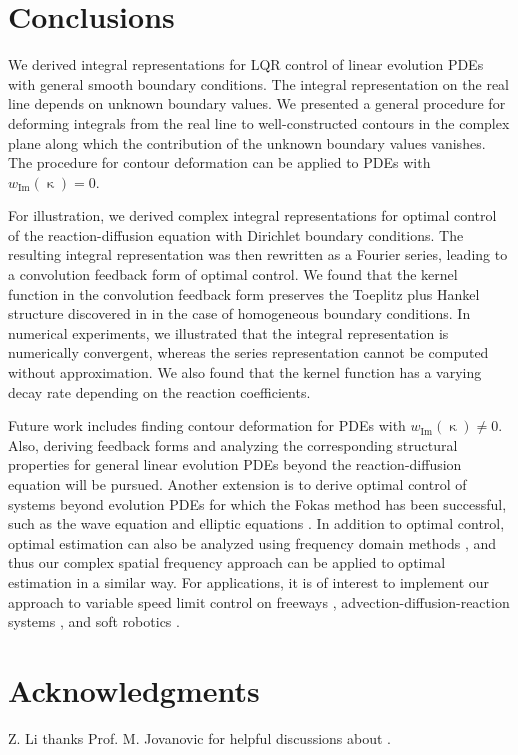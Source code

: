 \documentclass[journal,twoside,web]{ieeecolor}
\newcommand{\kcomplex}{\upkappa}
\begin{document}
\section{Conclusions}\label{sec:conclusion}
We derived integral representations for LQR control of linear evolution PDEs with general smooth boundary conditions. 
The integral representation on the real line depends on unknown boundary values.
We presented a general procedure for deforming integrals from the real line to well-constructed contours in the complex plane along which the contribution of the unknown boundary values vanishes. 
The procedure for contour deformation can be applied to PDEs with $w_{\text{Im}}(\kcomplex)=0$. 

For illustration, we derived complex integral representations for optimal control of the reaction-diffusion equation with Dirichlet boundary conditions.
The resulting integral representation was then rewritten as a Fourier series, leading to a convolution feedback form of optimal control.
We found that the kernel function in the convolution feedback form preserves the Toeplitz plus Hankel structure discovered in \cite{epperlein2016spatially} in the case of homogeneous boundary conditions.
In numerical experiments, we illustrated that the integral representation is numerically convergent, whereas the series representation cannot be computed without approximation.
We also found that the kernel function has a varying decay rate depending on the reaction coefficients.

Future work includes finding contour deformation for PDEs with $w_{\text{Im}}(\kcomplex)\neq0$. Also, deriving feedback forms and analyzing the corresponding structural properties for general linear evolution PDEs beyond the reaction-diffusion equation will be pursued.
Another extension is to derive optimal control of systems beyond evolution PDEs for which the Fokas method has been successful, such as the wave equation and elliptic equations \cite{fokasbook}.
In addition to optimal control, optimal estimation can also be analyzed using frequency domain methods \cite{arbelaiz2024optimal}, and thus our complex spatial frequency approach can be applied to optimal estimation in a similar way.
For applications, it is of interest to implement our approach to variable speed limit control on freeways \cite{delle2017traffic,block2024lq}, advection-diffusion-reaction systems \cite{glowinski2022bilinear}, and soft robotics \cite{della2023model}.

\section*{Acknowledgments}
Z. Li thanks Prof. M. Jovanovic for helpful discussions about .
\end{document}
